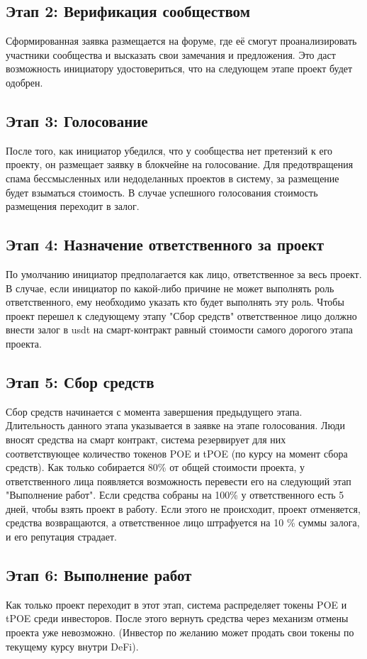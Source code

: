 \documentclass[a4paper,12pt]{report}
\begin{document}
\subsection{Этап 2: Верификация сообществом}
	Сформированная заявка размещается на форуме, где её смогут проанализировать участники сообщества и высказать свои замечания и предложения. Это даст возможность инициатору удостовериться, что на следующем этапе проект будет одобрен.

\subsection{Этап 3: Голосование}
	После того, как инициатор убедился, что у сообщества нет претензий к его проекту, он размещает заявку в блокчейне на голосование. Для предотвращения  спама бессмысленных или недоделанных проектов в систему, за размещение будет взыматься стоимость. В случае успешного голосования стоимость размещения переходит в залог.

\subsection{Этап 4: Назначение ответственного за проект}
	По умолчанию инициатор предполагается как лицо, ответственное за весь проект. В случае, если инициатор по какой-либо причине не может выполнять роль ответственного, ему необходимо указать кто будет выполнять эту роль. Чтобы проект перешел к следующему этапу "Сбор средств" ответственное лицо должно внести залог в usdt на смарт-контракт равный стоимости самого дорогого этапа проекта.

\subsection{Этап 5: Сбор средств}
	Сбор средств начинается с момента завершения предыдущего этапа. Длительность данного этапа указывается в заявке на этапе голосования. Люди вносят средства на смарт контракт, система резервирует для них соответствующее количество токенов POE и tPOE (по курсу на момент сбора средств). Как только собирается 80\% от общей стоимости проекта, у ответственного лица появляется возможность перевести его на следующий этап "Выполнение работ". Если средства собраны на 100\% у ответственного есть 5 дней, чтобы взять проект в работу. Если этого не происходит, проект отменяется, средства возвращаются, а ответственное лицо штрафуется на 10 \% суммы залога, и его репутация страдает. 

\subsection{Этап 6: Выполнение работ}
	Как только проект переходит в этот этап, система распределяет токены POE и tPOE среди инвесторов. После этого вернуть средства через механизм отмены проекта уже невозможно. (Инвестор по желанию может продать свои токены по текущему курсу внутри DeFi). 
\end{document}

